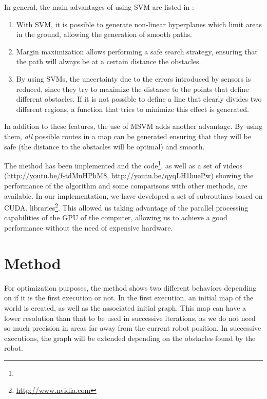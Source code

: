 In general, the main advantages of using \ac{SVM}  are listed in \cite{miura2006support}:

\begin{enumerate}
\item With \ac{SVM}, it is possible to generate non-linear hyperplanes which limit areas in the ground, allowing the generation of smooth paths.
\item Margin maximization allows performing a safe search strategy, ensuring that the path will always be at a certain distance the obstacles.
\item By using \acp{SVM}, the uncertainty due to the errors introduced by sensors is reduced, since they try to maximize the distance to the points that define different obstacles. If it is not possible to define a line that clearly divides two different regions, a function that tries to minimize this effect is generated.
\end{enumerate}

In addition to these features, the use of \acl{MSVM} adds another advantage.  By using them, \emph{all} possible routes in a map can be generated ensuring that they will be safe (the distance to the obstacles will be optimal) and smooth.

The method has been implemented and the code\footnote{}, as well as a set of videos (\url{http://youtu.be/f-tdMnHPhM8}, \url{http://youtu.be/qyqLH1huePw}) showing the performance of the algorithm and some comparisons with other methods, are available. In our implementation, we have developed a set of subroutines based on \ac{CUDA}. libraries\footnote{\url{http://www.nvidia.com}}. This allowed us taking advantage of the parallel processing capabilities of the \ac{GPU} of the computer, allowing us to achieve a good performance without the need of expensive hardware.

\section{Method}\label{ch:chapter06_01}

For optimization purposes, the method shows two different behaviors depending on if it is the first execution or not. In the first execution, an initial map of the world is created, as well as the associated initial graph. This map can have a lower resolution than that to be used in successive iterations, as we do not need so much precision in areas far away from the current robot position. In successive executions, the graph will be extended depending on the obstacles found by the robot.

